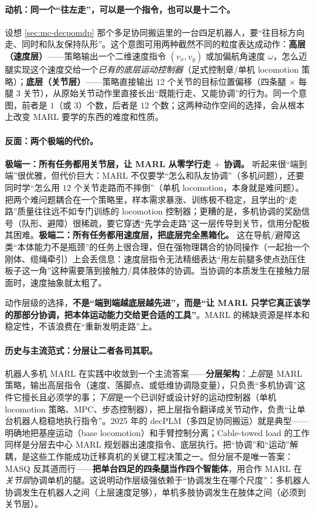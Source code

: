 \paragraph{动机：同一个“往左走”，可以是一个指令，也可以是十二个。}
设想 \cref{sec:mc-decpomdp} 那个多足协同搬运里的一台四足机器人，要“往目标方向走、同时和队友保持队形”。这个意图可用两种截然不同的粒度表达成动作：\textbf{高层（速度层）}——策略输出一个二维速度指令 $(v_x,v_y)$ 或加偏航角速度 $\omega$，怎么迈腿实现这个速度交给一个\emph{已有的底层运动控制器}（足式控制章/单机 locomotion 策略）；\textbf{底层（关节层）}——策略直接输出 $12$ 个关节的目标位置偏移（四条腿 $\times$ 每腿 $3$ 关节），从原始关节动作里直接长出“既能行走、又能协调”的行为。同一个意图，前者是 $1$（或 $3$）个数，后者是 $12$ 个数；这两种动作空间的选择，会从根本上改变 MARL 要学的东西的难度和性质。

\paragraph{反面：两个极端的代价。}
\textbf{极端一：所有任务都用关节层，让 MARL 从零学行走 $+$ 协调。} 听起来很“端到端”很优雅，但代价巨大：MARL 不仅要学“怎么和队友协调”（多机问题），还要同时学“怎么用 $12$ 个关节走路而不摔倒”（单机 locomotion，本身就是难问题）。把两个难问题耦合在一个策略里，样本需求暴涨、训练极不稳定，且学出的“走路”质量往往远不如专门训练的 locomotion 控制器；更糟的是，多机协调的奖励信号（队形、避障）很稀疏，要它穿透“先学会走路”这一层传导到关节，信用分配极其困难。\textbf{极端二：所有任务都用速度层，把底层完全黑箱化。} 这在导航/避障这类“本体能力不是瓶颈”的任务上很合理，但在强物理耦合的协同操作（一起抬一个刚体、缆绳牵引）上会丢信息：速度层指令无法精细表达“用左前腿多使点劲压住板子这一角”这种需要落到接触力/具体肢体的协调。当协调的本质发生在接触力层面时，速度抽象就太粗了。

\begin{insight}
动作层级的选择，\textbf{不是“端到端越底层越先进”，而是“让 MARL 只学它真正该学的那部分协调，把本体运动能力交给更合适的工具”}。MARL 的稀缺资源是样本和稳定性，不该浪费在“重新发明走路”上。
\end{insight}

\paragraph{历史与主流范式：分层让二者各司其职。}
机器人多机 MARL 在实践中收敛到一个主流答案——\textbf{分层架构}：\emph{上层}是 MARL 策略，输出高层指令（速度、落脚点、或低维协调隐变量），只负责“多机协调”这件它擅长且必须学的事；\emph{下层}是一个已训好或设计好的运动控制器（单机 locomotion 策略、MPC、步态控制器），把上层指令翻译成关节动作，负责“让单台机器人稳稳地执行指令”。2025 年的 decPLM（多四足协同搬运）就是典型——明确地把基座运动（base locomotion）和手臂控制分离\cite{pandit2025decplm}；Cable-towed load 的工作同样是分层去中心 MARL 规划器出速度指令、底层执行。把“协调”和“运动”解耦，是这些工作能成功迁移真机的关键工程决策之一。但分层不是唯一答案：MASQ 反其道而行——\textbf{把单台四足的四条腿当作四个智能体}，用合作 MARL 在\emph{关节层}协调单机的腿\cite{masq2024}。这说明动作层级强依赖于“协调发生在哪个尺度”：多机器人协调发生在机器人之间（上层速度足够），单机多肢协调发生在肢体之间（必须到关节层）。

